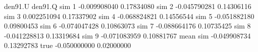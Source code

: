 \begin{Schunk}
\begin{Soutput}
              den91.U    den91.Q
sim 1    -0.009908040 0.17834080
sim 2    -0.045790281 0.14306116
sim 3     0.002251094 0.17337902
sim 4    -0.068824821 0.14556544
sim 5    -0.051882180 0.09800453
sim 6    -0.074047428 0.10863073
sim 7    -0.088664176 0.10735425
sim 8    -0.041228813 0.13319684
sim 9    -0.071083959 0.10881767
mean sim -0.049908734 0.13292783
true     -0.050000000 0.02000000
\end{Soutput}
\end{Schunk}

